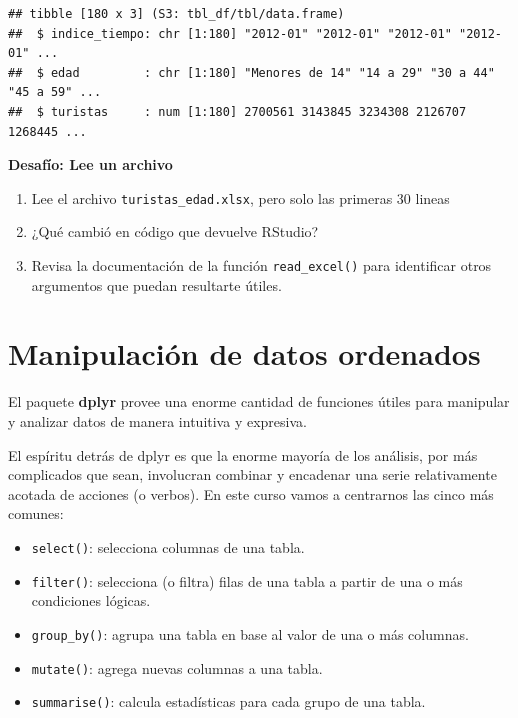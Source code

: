 \documentclass[
  openany]{book}
\providecommand{\tightlist}{%
  \setlength{\itemsep}{0pt}\setlength{\parskip}{0pt}}
\begin{document}
\begin{verbatim}
## tibble [180 x 3] (S3: tbl_df/tbl/data.frame)
##  $ indice_tiempo: chr [1:180] "2012-01" "2012-01" "2012-01" "2012-01" ...
##  $ edad         : chr [1:180] "Menores de 14" "14 a 29" "30 a 44" "45 a 59" ...
##  $ turistas     : num [1:180] 2700561 3143845 3234308 2126707 1268445 ...
\end{verbatim}

\textbf{Desafío: Lee un archivo}

\begin{enumerate}
\def\labelenumi{\arabic{enumi}.}
\tightlist
\item
  Lee el archivo \texttt{turistas\_edad.xlsx}, pero solo las primeras 30 lineas
\item
  ¿Qué cambió en código que devuelve RStudio?
\item
  Revisa la documentación de la función \texttt{read\_excel()} para identificar otros argumentos que puedan resultarte útiles.
\end{enumerate}

\hypertarget{manipulaciuxf3n-de-datos-ordenados}{%
\chapter{Manipulación de datos ordenados}\label{manipulaciuxf3n-de-datos-ordenados}}

El paquete \textbf{dplyr} provee una enorme cantidad de funciones útiles para manipular y analizar datos de manera intuitiva y expresiva.

El espíritu detrás de dplyr es que la enorme mayoría de los análisis, por más complicados que sean, involucran combinar y encadenar una serie relativamente acotada de acciones (o verbos).
En este curso vamos a centrarnos las cinco más comunes:

\begin{itemize}
\tightlist
\item
  \texttt{select()}: selecciona columnas de una tabla.
\item
  \texttt{filter()}: selecciona (o filtra) filas de una tabla a partir de una o más condiciones lógicas.
\item
  \texttt{group\_by()}: agrupa una tabla en base al valor de una o más columnas.
\item
  \texttt{mutate()}: agrega nuevas columnas a una tabla.
\item
  \texttt{summarise()}: calcula estadísticas para cada grupo de una tabla.
\end{itemize}
\end{document}

